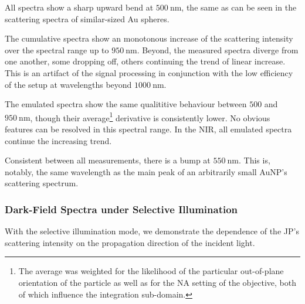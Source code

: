 \documentclass[10pt]{article}
\begin{document}
\begin{multicols}{2}

All spectra show a sharp upward bend at $\SI{500}{\nano\meter}$, the same as can be seen in the scattering spectra of similar-sized Au spheres. 

The cumulative spectra show an monotonous increase of the scattering intensity over the spectral range up to $\SI{950}{\nano\meter}$. 
Beyond, the measured spectra diverge from one another, some dropping off, others continuing the trend of linear increase.  
This is an artifact of the signal processing in conjunction with the low efficiency of the setup at wavelengths beyond $\SI{1000}{\nano\meter}$. 


The emulated spectra show the same qualititive behaviour between $500$ and $\SI{950}{\nano\meter}$, though their average\footnote{The average was weighted for the likelihood of the particular out-of-plane orientation of the particle as well as for the NA setting of the objective, both of which influence the integration sub-domain.} derivative is consistently  lower. 
No obvious features can be resolved in this spectral range. 
In the NIR, all emulated spectra continue the increasing trend. 


Consistent between all measurements, there is a bump at $\SI{550}{\nano\meter}$. 
This is, notably, the same wavelength as the main peak of an arbitrarily small AuNP's scattering spectrum. 




\subsubsection*{Dark-Field Spectra under Selective Illumination}


With the selective illumination mode, we demonstrate the dependence of the JP's scattering intensity on the propagation direction of the incident light. 





\end{multicols}
\end{document}
